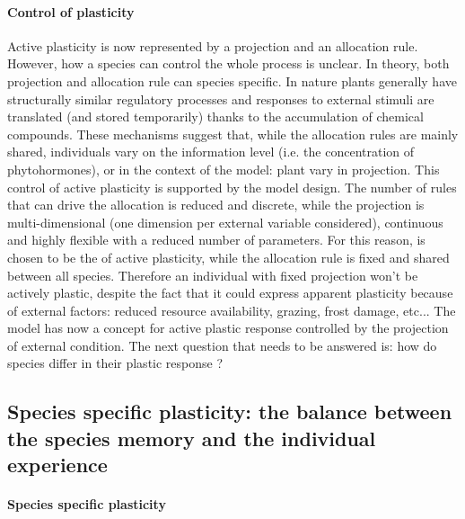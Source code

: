 \paragraph{Control of plasticity}
Active plasticity is now represented by a projection and an allocation rule. However, how a species can control the whole process is unclear. In theory, both projection and allocation rule can species specific. In nature plants generally have structurally similar regulatory processes and responses to external stimuli are translated (and stored temporarily) thanks to the accumulation of chemical compounds. These mechanisms suggest that, while the allocation rules are mainly shared, individuals vary on the information level (i.e. the concentration of phytohormones), or in the context of the model: plant vary in projection. This control of active plasticity is supported by the model design. The number of rules that can drive the allocation is reduced and discrete, while the projection is multi-dimensional (one dimension per external variable considered), continuous and highly flexible with a reduced number of parameters.
For this reason,  is chosen to be the  of active plasticity, while the allocation rule is fixed and shared between all species. Therefore an individual with fixed projection won't be actively plastic, despite the fact that it could express apparent plasticity because of external factors: reduced resource availability, grazing, frost damage, etc... The model has now a concept for active plastic response controlled by the projection of external condition. The next question that needs to be answered is: how do species differ in their plastic response ?\\

\subsection{Species specific plasticity: the balance between the species memory and the individual experience}

\paragraph{Species specific plasticity}

